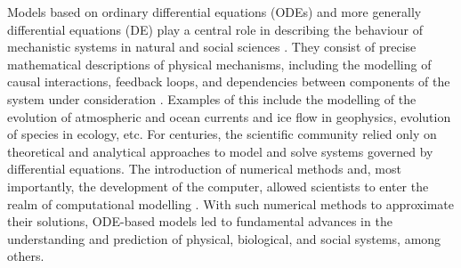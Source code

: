 Models based on ordinary differential equations (ODEs) and more generally differential equations (DE) play a central role in describing the behaviour of mechanistic systems in natural and social sciences \cite{Ghattas.2021}.
They consist of precise mathematical descriptions of physical mechanisms, including the modelling of causal interactions, feedback loops, and dependencies between components of the system under consideration \cite{rackauckas2020universal}.
Examples of this include the modelling of the evolution of atmospheric and ocean currents and ice flow in geophysics, evolution of species in ecology, etc.  
For centuries, the scientific community relied only on theoretical and analytical approaches to model and solve systems governed by differential equations. 
The introduction of numerical methods and, most importantly, the development of the computer, allowed scientists to enter the realm of computational modelling \cite{hey2009}. 
With such numerical methods to approximate their solutions, ODE-based models led to fundamental advances in the understanding and prediction of physical, biological, and social systems, among others.



